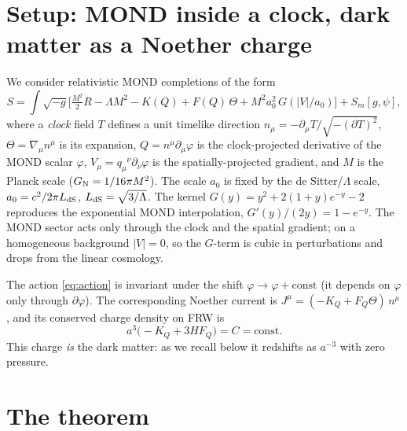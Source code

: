 \documentclass[11pt,letterpaper]{article}
\begin{document}
\section{Setup: MOND inside a clock, dark matter as a Noether charge}

We consider relativistic MOND completions of the form
\begin{equation}
S=\int\!\sqrt{-g}\Big[\tfrac{M^2}{2}R-\Lambda M^2-K(Q)+F(Q)\,\Theta+M^2a_0^2\,G(|V|/a_0)\Big]+S_m[g,\psi],
\label{eq:action}
\end{equation}
where a \emph{clock} field $T$ defines a unit timelike direction $n_\mu=-\partial_\mu T/\sqrt{-(\partial T)^2}$,
$\Theta=\nabla_\mu n^\mu$ is its expansion, $Q=n^\mu\partial_\mu\varphi$ is the clock-projected derivative of
the MOND scalar $\varphi$, $V_\mu=q_\mu{}^\nu\partial_\nu\varphi$ is the spatially-projected gradient, and $M$
is the Planck scale ($G_{\rm N}=1/16\pi M^2$). The scale $a_0$ is fixed by the de Sitter/$\Lambda$ scale,
$a_0=c^2/2\pi L_{\rm dS}$, $L_{\rm dS}=\sqrt{3/\Lambda}$. The kernel $G(y)=y^2+2(1+y)e^{-y}-2$ reproduces the
exponential MOND interpolation, $G'(y)/(2y)=1-e^{-y}$. The MOND sector acts only through the clock and the
spatial gradient; on a homogeneous background $|V|=0$, so the $G$-term is cubic in perturbations and drops
from the linear cosmology.

The action \eqref{eq:action} is invariant under the shift $\varphi\to\varphi+\text{const}$ (it depends on
$\varphi$ only through $\partial\varphi$). The corresponding Noether current is
$J^\mu=(-K_Q+F_Q\Theta)\,n^\mu$, and its conserved charge density on FRW is
\begin{equation}
a^3\big(-K_Q+3HF_Q\big)=C=\text{const}.
\label{eq:charge}
\end{equation}
This charge \emph{is} the dark matter: as we recall below it redshifts as $a^{-3}$ with zero pressure.

\section{The theorem}
\end{document}
